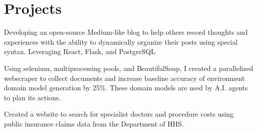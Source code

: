 \documentclass[]{deedy-resume-openfont}
\begin{document}
\begin{minipage}[t]{0.66\textwidth}
\section{Projects}

\begin{tightemize}
\item Developing an open-source Medium-like blog to help others record thoughts and experiences with the ability to dynamically organize their posts using special syntax. Leveraging React, Flask, and PostgreSQL
\end{tightemize}
\sectionsep

\begin{tightemize}
\item Using selenium, multiprocessing pools, and BeautifulSoup, I created a parallelized webscraper to collect documents and increase baseline accuracy of environment domain model generation by 25\%. These domain models are used by A.I. agents to plan its actions.
\end{tightemize}
\sectionsep

\begin{tightemize}
\item Created a website to search for specialist doctors and procedure costs using public insurance claims data from the Department of HHS.
\end{tightemize}




\end{minipage}
\end{document}
